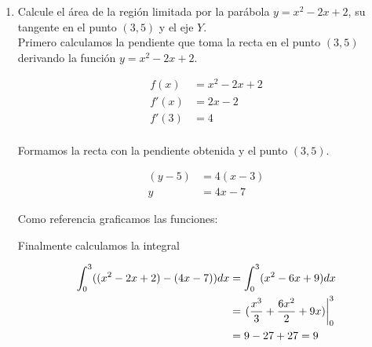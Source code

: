\documentclass[letterpaper,10pt]{article}
\newcommand{\dis}{\displaystyle}
\begin{document}
\begin{enumerate}
\newpage
\item Calcule el \'{a}rea de la regi\'{o}n limitada por la par\'{a}bola
$y=x^2-2x+2$, su tangente en el punto $(3,5)$ y el eje $Y$.\\


Primero calculamos la pendiente que toma la recta en el punto $(3,5)$ derivando la función $y=x^2-2x+2$.

\begin{align*}
\dis f(x) &= x^2-2x+2\\
\dis f'(x) &= 2x-2\\
\dis f'(3) &= 4\\
\end{align*}

Formamos la recta con la pendiente obtenida y el punto $(3,5)$.

\begin{align*}
\dis (y-5) &= 4(x-3)\\
\dis  y &= 4x-7
\end{align*}

Como referencia graficamos las funciones:

\begin{figure}[!htb]\centering
   \begin{minipage}{0.6\textwidth}
     
   \end{minipage}
   \begin {minipage}{0.3\textwidth}
     
   \end{minipage}
\end{figure}


\newpage
Finalmente calculamos la integral

\begin{align*}
\dis \int_{0}^3 ((x^2-2x+2) - (4x-7))dx &= \int_{0}^3 (x^2-6x+9)dx\\
\dis  &= \displaystyle   \left.(\frac{x^3}{3} + \frac{6x^2}{2} + 9x)\right|_{0}^{3}\\
\dis  &= 9-27+27 = 9
\end{align*}


\end{enumerate}




\vspace{10mm}
\end{document}
